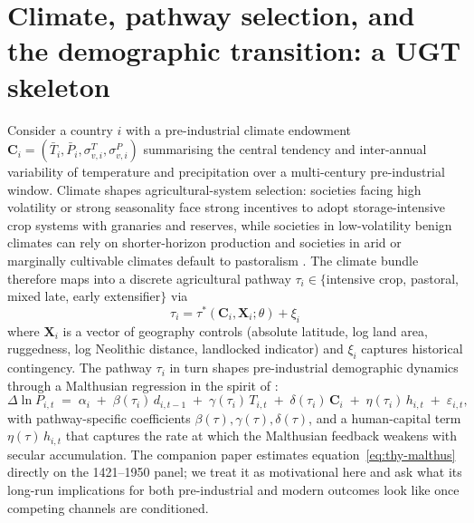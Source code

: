 \documentclass[11pt,letterpaper]{article}
\begin{document}
\section{Climate, pathway selection, and the demographic transition: a UGT skeleton}
\label{sec:theory}

Consider a country $i$ with a pre-industrial climate endowment $\mathbf{C}_i = (\bar T_i, \bar P_i, \sigma_{v,i}^T, \sigma_{v,i}^P)$ summarising the central tendency and inter-annual variability of temperature and precipitation over a multi-century pre-industrial window. Climate shapes agricultural-system selection: societies facing high volatility or strong seasonality face strong incentives to adopt storage-intensive crop systems with granaries and reserves, while societies in low-volatility benign climates can rely on shorter-horizon production and societies in arid or marginally cultivable climates default to pastoralism \citep{matranga2024}. The climate bundle therefore maps into a discrete agricultural pathway $\tau_i \in \{$intensive crop, pastoral, mixed late, early extensifier$\}$ via
\begin{equation}
  \tau_i = \tau^*(\mathbf{C}_i, \mathbf{X}_i; \theta) + \xi_i
  \label{eq:thy-pathway}
\end{equation}
where $\mathbf{X}_i$ is a vector of geography controls (absolute latitude, log land area, ruggedness, log Neolithic distance, landlocked indicator) and $\xi_i$ captures historical contingency. The pathway $\tau_i$ in turn shapes pre-industrial demographic dynamics through a Malthusian regression in the spirit of \citet{ashraf2011dynamics}:
\begin{equation}
  \Delta \ln P_{i,t} \;=\; \alpha_i \;+\; \beta(\tau_i)\, d_{i,t-1} \;+\; \gamma(\tau_i)\, T_{i,t} \;+\; \delta(\tau_i)\, \mathbf{C}_i \;+\; \eta(\tau_i)\, h_{i,t} \;+\; \varepsilon_{i,t},
  \label{eq:thy-malthus}
\end{equation}
with pathway-specific coefficients $\beta(\tau), \gamma(\tau), \delta(\tau)$, and a human-capital term $\eta(\tau)\, h_{i,t}$ that captures the rate at which the Malthusian feedback weakens with secular accumulation. The companion paper \citep{alonso_long_shadow} estimates equation~\eqref{eq:thy-malthus} directly on the 1421--1950 panel; we treat it as motivational here and ask what its long-run implications for both pre-industrial and modern outcomes look like once competing channels are conditioned.
\end{document}
